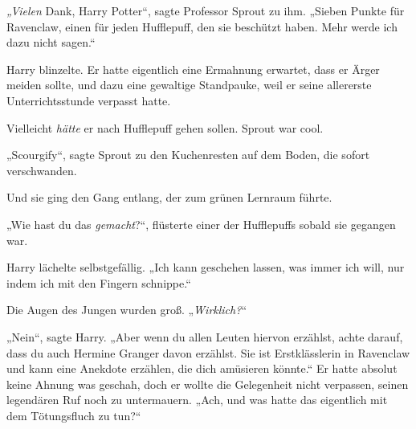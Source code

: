 \emph{„Vielen} Dank, Harry Potter“, sagte Professor Sprout zu ihm. „Sieben Punkte für Ravenclaw, einen für jeden Hufflepuff, den sie beschützt haben. Mehr werde ich dazu nicht sagen.“

Harry blinzelte. Er hatte eigentlich eine Ermahnung erwartet, dass er Ärger meiden sollte, und dazu eine gewaltige Standpauke, weil er seine allererste Unterrichtsstunde verpasst hatte.

Vielleicht \emph{hätte} er nach Hufflepuff gehen sollen. Sprout war cool.

„Scourgify“, sagte Sprout zu den Kuchenresten auf dem Boden, die sofort verschwanden.

Und sie ging den Gang entlang, der zum grünen Lernraum führte.

„Wie hast du das \emph{gemacht}?“, flüsterte einer der Hufflepuffs sobald sie gegangen war.

Harry lächelte selbstgefällig. „Ich kann geschehen lassen, was immer ich will, nur indem ich mit den Fingern schnippe.“

Die Augen des Jungen wurden groß. „\emph{Wirklich?}“

„Nein“, sagte Harry. „Aber wenn du allen Leuten hiervon erzählst, achte darauf, dass du auch Hermine Granger davon erzählst. Sie ist Erstklässlerin in Ravenclaw und kann eine Anekdote erzählen, die dich amüsieren könnte.“ Er hatte absolut keine Ahnung was geschah, doch er wollte die Gelegenheit nicht verpassen, seinen legendären Ruf noch zu untermauern. „Ach, und was hatte das eigentlich mit dem Tötungsfluch zu tun?“

